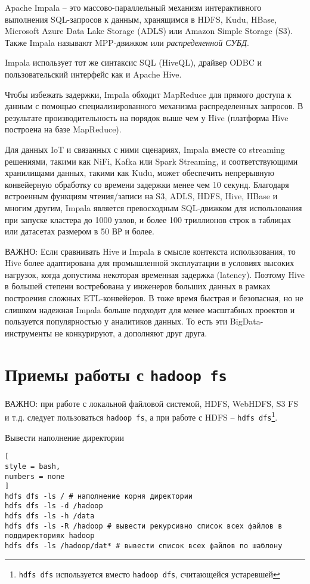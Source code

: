 \documentclass[%
	11pt,
	a4paper,
	utf8,
		]{article}
\begin{document}
Apache Impala -- это массово-параллельный механизм интерактивного выполнения SQL-запросов к данным, хранящимся в HDFS, Kudu, HBase, Microsoft Azure Data Lake Storage (ADLS) или Amazon Simple Storage (S3). Также Impala называют MPP-движком или \emph{распределенной СУБД}.

Impala использует тот же синтаксис SQL (HiveQL), драйвер ODBC и пользовательский интерфейс как и Apache Hive.

Чтобы избежать задержки, Impala обходит MapReduce для прямого доступа к данным с помощью специализированного механизма распределенных запросов. В результате производительность на порядок выше чем у Hive (платформа Hive построена на базе MapReduce).

Для данных IoT и связанных с ними сценариях, Impala вместе со streaming решениями, такими как NiFi, Kafka или Spark Streaming, и соответствующими хранилищами данных, такими как Kudu, может обеспечить непрерывную конвейерную обработку со времени задержки менее чем 10 секунд. Благодаря встроенным функциям чтения/записи на S3, ADLS, HDFS, Hive, HBase и многим другим, Impala является превосходным SQL-движком для использования при запуске кластера до 1000 узлов, и более 100 триллионов строк в таблицах или датасетах размером в 50 ВР и более.

ВАЖНО: Если сравнивать Hive и Impala в смысле контекста использования, то Hive более адаптирована для промышленной эксплуатации в условиях высоких нагрузок, когда допустима некоторая временная задержка (latency). Поэтому Hive в большей степени востребована у инженеров больших данных в рамках построения сложных ETL-конвейеров. В тоже время быстрая и безопасная, но не слишком надежная Impala больше подходит для менее масштабных проектов и пользуется популярностью у аналитиков данных. То есть эти BigData-инструменты не конкурируют, а дополняют друг друга. 


\section{Приемы работы с \texttt{hadoop fs}}

ВАЖНО: при работе с локальной файловой системой, HDFS, WebHDFS, S3 FS и т.д. следует пользоваться \texttt{hadoop fs}, а при работе с HDFS -- \texttt{hdfs dfs}\footnote{\texttt{hdfs dfs} используется вместо \texttt{hadoop dfs}, считающейся устаревшей}.

Вывести наполнение директории
\begin{lstlisting}[
style = bash,
numbers = none	
]
hdfs dfs -ls / # наполнение корня директории
hdfs dfs -ls -d /hadoop
hdfs dfs -ls -h /data
hdfs dfs -ls -R /hadoop # вывести рекурсивно список всех файлов в поддиректориях hadoop
hdfs dfs -ls /hadoop/dat* # вывести список всех файлов по шаблону
\end{lstlisting}
\end{document}
